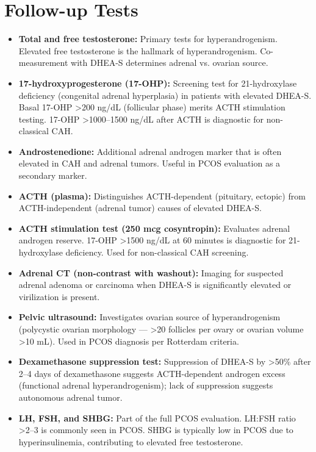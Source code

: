 \section*{Follow-up Tests}
\begin{itemize}
  \item \textbf{Total and free testosterone:} Primary tests for hyperandrogenism. Elevated free testosterone is the hallmark of hyperandrogenism. Co-measurement with DHEA-S determines adrenal vs. ovarian source.
  \item \textbf{17-hydroxyprogesterone (17-OHP):} Screening test for 21-hydroxylase deficiency (congenital adrenal hyperplasia) in patients with elevated DHEA-S. Basal 17-OHP >200 ng/dL (follicular phase) merits ACTH stimulation testing. 17-OHP >1000--1500 ng/dL after ACTH is diagnostic for non-classical CAH.
  \item \textbf{Androstenedione:} Additional adrenal androgen marker that is often elevated in CAH and adrenal tumors. Useful in PCOS evaluation as a secondary marker.
  \item \textbf{ACTH (plasma):} Distinguishes ACTH-dependent (pituitary, ectopic) from ACTH-independent (adrenal tumor) causes of elevated DHEA-S.
  \item \textbf{ACTH stimulation test (250 mcg cosyntropin):} Evaluates adrenal androgen reserve. 17-OHP >1500 ng/dL at 60 minutes is diagnostic for 21-hydroxylase deficiency. Used for non-classical CAH screening.
  \item \textbf{Adrenal CT (non-contrast with washout):} Imaging for suspected adrenal adenoma or carcinoma when DHEA-S is significantly elevated or virilization is present.
  \item \textbf{Pelvic ultrasound:} Investigates ovarian source of hyperandrogenism (polycystic ovarian morphology --- >20 follicles per ovary or ovarian volume >10 mL). Used in PCOS diagnosis per Rotterdam criteria.
  \item \textbf{Dexamethasone suppression test:} Suppression of DHEA-S by >50\% after 2--4 days of dexamethasone suggests ACTH-dependent androgen excess (functional adrenal hyperandrogenism); lack of suppression suggests autonomous adrenal tumor.
  \item \textbf{LH, FSH, and SHBG:} Part of the full PCOS evaluation. LH:FSH ratio >2--3 is commonly seen in PCOS. SHBG is typically low in PCOS due to hyperinsulinemia, contributing to elevated free testosterone.
\end{itemize}


